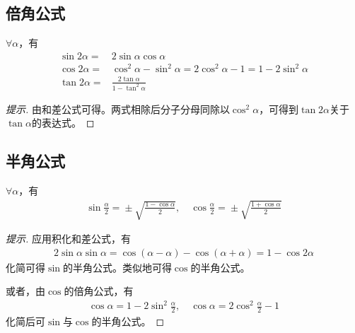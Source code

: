 \subsection{倍角公式}
\label{sec:double-angle-formula}

\begin{theorem}[倍角公式]$\forall \alpha$，有
  \begin{align*}
    \sin 2\alpha ={}& 2\sin\alpha\cos\alpha\\
    \cos 2\alpha ={}& \cos^2\alpha - \sin^2\alpha = 2\cos^2\alpha - 1 = 1 - 2\sin^2\alpha\\[3pt]
    \tan 2\alpha ={}& \frac{2\tan\alpha}{1 - \tan^2\alpha}
  \end{align*}
\end{theorem}
\begin{proof}[提示]
  由和差公式可得。两式相除后分子分母同除以$\cos^2\alpha$，可得到$\tan2\alpha$关于$\tan\alpha$的表达式。
\end{proof}

\subsection{半角公式}
\label{sec:half-angle-formula}

\begin{theorem}[正弦余弦半角公式]$\forall \alpha$，有
  \begin{align*}
    \sin\frac\alpha2 ={} \pm\sqrt{\frac{1-\cos\alpha}2},\quad
    \cos\frac\alpha2 ={} \pm\sqrt{\frac{1+\cos\alpha}2}
  \end{align*}
\end{theorem}
\begin{proof}[提示]
  应用积化和差公式，有
  \begin{align*}
    2\sin\alpha\sin\alpha = \cos(\alpha - \alpha) - \cos(\alpha + \alpha) = 1 - \cos2\alpha
  \end{align*}
  化简可得$\sin$的半角公式。类似地可得$\cos$的半角公式。

  或者，由$\cos$的倍角公式，有
  \begin{align*}
    \cos\alpha = 1 - 2\sin^2\frac\alpha2, \quad \cos\alpha = 2\cos^2\frac\alpha2 - 1
  \end{align*}
  化简后可$\sin$与$\cos$的半角公式。
\end{proof}

